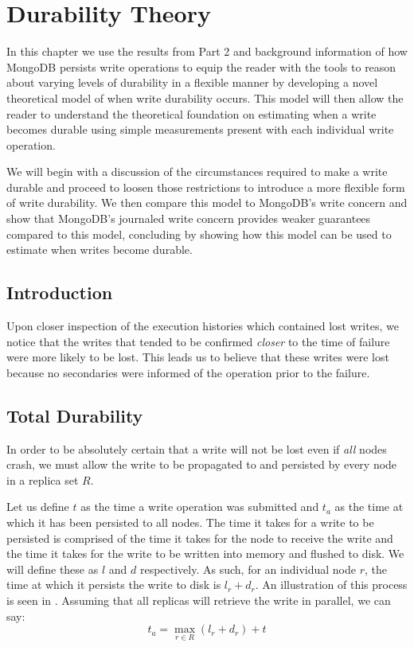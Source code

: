 \chapter{Durability Theory} \label{chap:kdur-theory}

In this chapter we use the results from Part 2 and background information of how MongoDB persists write operations to equip the reader with the tools to reason about varying levels of durability in a flexible manner by developing a novel theoretical model of when write durability occurs. This model will then allow the reader to understand the theoretical foundation on estimating when a write becomes durable using simple measurements present with each individual write operation.

We will begin with a discussion of the circumstances required to make a write durable and proceed to loosen those restrictions to introduce a more flexible form of write durability. We then compare this model to MongoDB's write concern and show that MongoDB's journaled write concern provides weaker guarantees compared to this model, concluding by showing how this model can be used to estimate when writes become durable.

\section{Introduction}
Upon closer inspection of the execution histories which contained lost writes, we notice that the writes that tended to be confirmed \textit{closer} to the time of failure were more likely to be lost. This leads us to believe that these writes were lost because no secondaries were informed of the operation prior to the failure.

\section{Total Durability}
In order to be absolutely certain that a write will not be lost even if \textit{all} nodes crash, we must allow the write to be propagated to and persisted by every node in a replica set $R$. 

Let us define $t$ as the time a write operation was submitted and $t_a$ as the time at which it has been persisted to all nodes. The time it takes for a write to be persisted is comprised of the time it takes for the node to receive the write and the time it takes for the write to be written into memory and flushed to disk. We will define these as $l$ and $d$ respectively. As such, for an individual node $r$, the time at which it persists the write to disk is $l_r + d_r$. An illustration of this process is seen in . Assuming that all replicas will retrieve the write in parallel, we can say:
\begin{equation} \label{eq:ta}
    t_a = \max_{r \in R}(l_r + d_r) + t
\end{equation}

